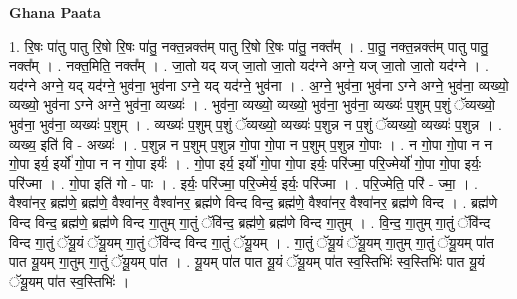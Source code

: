 \documentclass[17pt]{extarticle}
\begin{document}
\textbf{Ghana Paata } \newline

1. रि॒षः पा॑तु पातु रि॒षो रि॒षः पा॑तु॒ नक्त॒न्नक्त॑म् पातु रि॒षो रि॒षः पा॑तु॒ नक्त᳚म् । . पा॒तु॒ नक्त॒न्नक्त॑म् पातु पातु॒ नक्त᳚म् । . नक्त॒मिति॒ नक्त᳚म् । . जा॒तो यद् यज् जा॒तो जा॒तो यद॑ग्ने अग्ने॒ यज् जा॒तो जा॒तो यद॑ग्ने । . यद॑ग्ने अग्ने॒ यद् यद॑ग्ने॒ भुव॑ना॒ भुव॑ना ऽग्ने॒ यद् यद॑ग्ने॒ भुव॑ना । . अ॒ग्ने॒ भुव॑ना॒ भुव॑ना ऽग्ने अग्ने॒ भुव॑ना॒ व्यख्यो॒ व्यख्यो॒ भुव॑ना ऽग्ने अग्ने॒ भुव॑ना॒ व्यख्यः॑ । . भुव॑ना॒ व्यख्यो॒ व्यख्यो॒ भुव॑ना॒ भुव॑ना॒ व्यख्यः॑ प॒शुम् प॒शुं ॅव्यख्यो॒ भुव॑ना॒ भुव॑ना॒ व्यख्यः॑ प॒शुम् । . व्यख्यः॑ प॒शुम् प॒शुं ॅव्यख्यो॒ व्यख्यः॑ प॒शुन्न न प॒शुं ॅव्यख्यो॒ व्यख्यः॑ प॒शुन्न । . व्यख्य॒ इति॑ वि - अख्यः॑ । . प॒शुन्न न प॒शुम् प॒शुन्न गो॒पा गो॒पा न प॒शुम् प॒शुन्न गो॒पाः । . न गो॒पा गो॒पा न न गो॒पा इर्य॒ इर्यो॑ गो॒पा न न गो॒पा इर्यः॑ । . गो॒पा इर्य॒ इर्यो॑ गो॒पा गो॒पा इर्यः॒ परि॑ज्मा॒ परि॒ज्मेर्यो॑ गो॒पा गो॒पा इर्यः॒ परि॑ज्मा । . गो॒पा इति॑ गो - पाः । . इर्यः॒ परि॑ज्मा॒ परि॒ज्मेर्य॒ इर्यः॒ परि॑ज्मा । . परि॒ज्मेति॒ परि॑ - ज्मा॒ । . वैश्वा॑नर॒ ब्रह्म॑णे॒ ब्रह्म॑णे॒ वैश्वा॑नर॒ वैश्वा॑नर॒ ब्रह्म॑णे विन्द विन्द॒ ब्रह्म॑णे॒ वैश्वा॑नर॒ वैश्वा॑नर॒ ब्रह्म॑णे विन्द । . ब्रह्म॑णे विन्द विन्द॒ ब्रह्म॑णे॒ ब्रह्म॑णे विन्द गा॒तुम् गा॒तुं ॅवि॑न्द॒ ब्रह्म॑णे॒ ब्रह्म॑णे विन्द गा॒तुम् । . वि॒न्द॒ गा॒तुम् गा॒तुं ॅवि॑न्द विन्द गा॒तुं ॅयू॒यं ॅयू॒यम् गा॒तुं ॅवि॑न्द विन्द गा॒तुं ॅयू॒यम् । . गा॒तुं ॅयू॒यं ॅयू॒यम् गा॒तुम् गा॒तुं ॅयू॒यम् पा॑त पात यू॒यम् गा॒तुम् गा॒तुं ॅयू॒यम् पा॑त । . यू॒यम् पा॑त पात यू॒यं ॅयू॒यम् पा॑त स्व॒स्तिभिः॑ स्व॒स्तिभिः॑ पात यू॒यं ॅयू॒यम् पा॑त स्व॒स्तिभिः॑ । \newline
\end{document}

